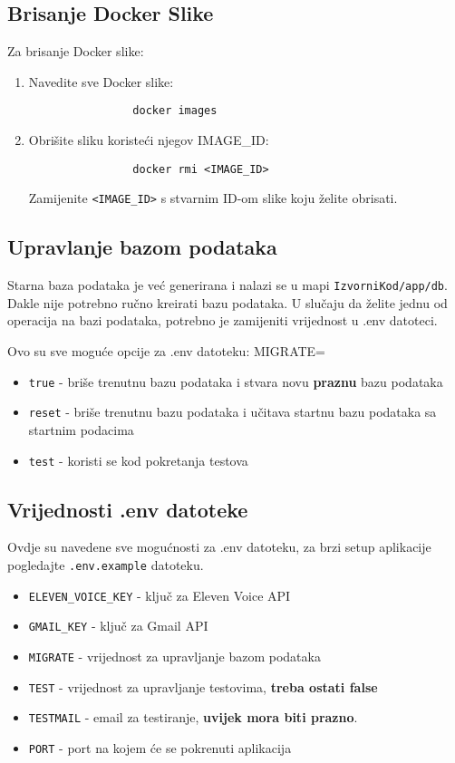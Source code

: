		\subsection*{Brisanje Docker Slike}
		Za brisanje Docker slike:
		\begin{enumerate}
			\item Navedite sve Docker slike:
			\begin{verbatim}
				docker images
			\end{verbatim}
			\item Obrišite sliku koristeći njegov IMAGE\_ID:
			\begin{verbatim}
				docker rmi <IMAGE_ID>
			\end{verbatim}
			Zamijenite \texttt{<IMAGE\_ID>} s stvarnim ID-om slike koju želite obrisati.
		\end{enumerate}

		\subsection*{Upravlanje bazom podataka}
			Starna baza podataka je već generirana i nalazi se u mapi \texttt{IzvorniKod/app/db}.
			Dakle nije potrebno ručno kreirati bazu podataka.
			U slučaju da želite jednu od operacija na bazi podataka, potrebno je zamijeniti vrijednost u .env datoteci.

			Ovo su sve moguće opcije za .env datoteku:
			MIGRATE=
			\begin{itemize}
				\item \texttt{true} - briše trenutnu bazu podataka i stvara novu \textbf{praznu} bazu podataka
				\item \texttt{reset} - briše trenutnu bazu podataka i učitava startnu bazu podataka sa startnim podacima
				\item \texttt{test} - koristi se kod pokretanja testova 
			\end{itemize}
	
		\subsection*{Vrijednosti .env datoteke}
			Ovdje su navedene sve mogućnosti za .env datoteku, za brzi setup aplikacije pogledajte \texttt{.env.example} datoteku.
			\begin{itemize}
				\item \texttt{ELEVEN\_VOICE\_KEY} - ključ za Eleven Voice API
				\item \texttt{GMAIL\_KEY} - ključ za Gmail API
				\item \texttt{MIGRATE} - vrijednost za upravljanje bazom podataka
				\item \texttt{TEST} - vrijednost za upravljanje testovima, \textbf{treba ostati false}
				\item \texttt{TESTMAIL} - email za testiranje, \textbf{uvijek mora biti prazno}.
				\item \texttt{PORT} - port na kojem će se pokrenuti aplikacija
			\end{itemize}
		
		\eject

